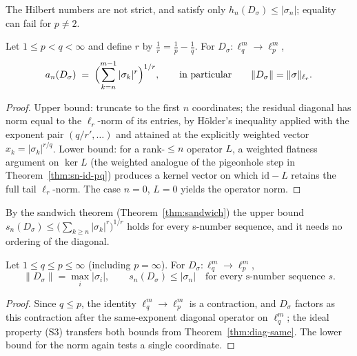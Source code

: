The Hilbert numbers are not strict, and satisfy only
$h_n(D_\sigma) \le |\sigma_n|$; equality can fail for $p \neq 2$.

\begin{theorem}
\label{thm:diag-mixed}
\leanok
{}
Let $1 \le p < q < \infty$ and define $r$ by
$\tfrac1r = \tfrac1p - \tfrac1q$. For $D_\sigma : \ell_q^m \to \ell_p^m$,
\[
  a_n(D_\sigma)
  \;=\; \Bigl( \sum_{k = n}^{m-1} |\sigma_k|^r \Bigr)^{1/r} ,
  \qquad\text{in particular}\qquad
  \|D_\sigma\| = \|\sigma\|_{\ell_r} .
\]
\end{theorem}
\begin{proof}
\leanok
{}
Upper bound: truncate to the first $n$ coordinates; the residual diagonal
has norm equal to the $\ell_r$-norm of its entries, by H\"older's
inequality applied with the exponent pair $(q/r', \dots)$ and attained at
the explicitly weighted vector $x_k = |\sigma_k|^{r/q}$. Lower bound:
for a rank-$\le n$ operator $L$, a weighted flatness argument on
$\ker L$ (the weighted analogue of the pigeonhole step in
Theorem~\ref{thm:sn-id-pq}) produces a kernel vector on which
$\mathrm{id} - L$ retains the full tail $\ell_r$-norm. The case $n = 0$,
$L = 0$ yields the operator norm.
\end{proof}

By the sandwich theorem (Theorem~\ref{thm:sandwich}) the upper bound
$s_n(D_\sigma) \le \bigl(\sum_{k \ge n} |\sigma_k|^r\bigr)^{1/r}$ holds for
every s-number sequence, and it needs no ordering of the diagonal.

\begin{theorem}
\label{thm:diag-reverse}
\leanok
{}
Let $1 \le q \le p \le \infty$ (including $p = \infty$). For
$D_\sigma : \ell_q^m \to \ell_p^m$,
\[
  \|D_\sigma\| = \max_i |\sigma_i| ,
  \qquad
  s_n(D_\sigma) \le |\sigma_n|
  \quad\text{for every s-number sequence $s$.}
\]
\end{theorem}
\begin{proof}
\leanok
{}
Since $q \le p$, the identity $\ell_q^m \to \ell_p^m$ is a contraction, and
$D_\sigma$ factors as this contraction after the same-exponent diagonal
operator on $\ell_q^m$; the ideal property (S3) transfers both bounds
from Theorem~\ref{thm:diag-same}. The lower bound for the norm again tests
a single coordinate.
\end{proof}

